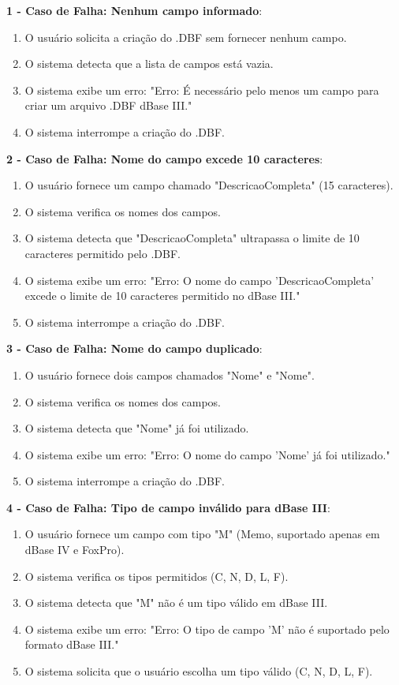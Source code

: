 \textbf{1 - Caso de Falha: Nenhum campo informado}:
\begin{enumerate}
    \item O usuário solicita a criação do .DBF sem fornecer nenhum campo.
    \item O sistema detecta que a lista de campos está vazia.
    \item O sistema exibe um erro: "Erro: É necessário pelo menos um campo para criar um arquivo .DBF dBase III."
    \item O sistema interrompe a criação do .DBF.
\end{enumerate}

\textbf{2 - Caso de Falha: Nome do campo excede 10 caracteres}:
\begin{enumerate}
    \item O usuário fornece um campo chamado "DescricaoCompleta" (15 caracteres).
    \item O sistema verifica os nomes dos campos.
    \item O sistema detecta que "DescricaoCompleta" ultrapassa o limite de 10 caracteres permitido pelo .DBF.
    \item O sistema exibe um erro: "Erro: O nome do campo 'DescricaoCompleta' excede o limite de 10 caracteres permitido no dBase III."
    \item O sistema interrompe a criação do .DBF.
\end{enumerate}

\textbf{3 - Caso de Falha: Nome do campo duplicado}:
\begin{enumerate}
    \item O usuário fornece dois campos chamados "Nome" e "Nome".
    \item O sistema verifica os nomes dos campos.
    \item O sistema detecta que "Nome" já foi utilizado.
    \item O sistema exibe um erro: "Erro: O nome do campo 'Nome' já foi utilizado."
    \item O sistema interrompe a criação do .DBF.
\end{enumerate}

\textbf{4 - Caso de Falha: Tipo de campo inválido para dBase III}:
\begin{enumerate}
    \item O usuário fornece um campo com tipo "M" (Memo, suportado apenas em dBase IV e FoxPro).
    \item O sistema verifica os tipos permitidos (C, N, D, L, F).
    \item O sistema detecta que "M" não é um tipo válido em dBase III.
    \item O sistema exibe um erro: "Erro: O tipo de campo 'M' não é suportado pelo formato dBase III."
    \item O sistema solicita que o usuário escolha um tipo válido (C, N, D, L, F).
\end{enumerate}

